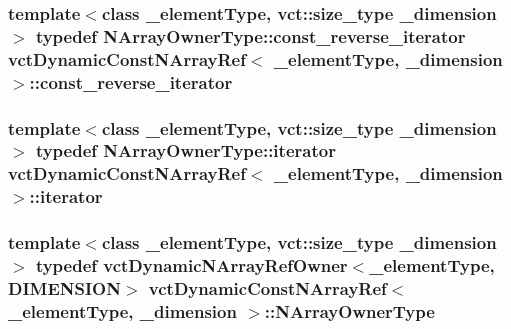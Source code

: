 \subsubsection[{const\+\_\+reverse\+\_\+iterator}]{\setlength{\rightskip}{0pt plus 5cm}template$<$class \+\_\+element\+Type, vct\+::size\+\_\+type \+\_\+dimension$>$ typedef {\bf N\+Array\+Owner\+Type\+::const\+\_\+reverse\+\_\+iterator} {\bf vct\+Dynamic\+Const\+N\+Array\+Ref}$<$ \+\_\+element\+Type, \+\_\+dimension $>$\+::{\bf const\+\_\+reverse\+\_\+iterator}}\label{classvct_dynamic_const_n_array_ref_ac774d4a8e4c0f0a5caeab26c96531d96}
\hypertarget{classvct_dynamic_const_n_array_ref_a29ec06cf468998d878719954c10bc973}{}
\subsubsection[{iterator}]{\setlength{\rightskip}{0pt plus 5cm}template$<$class \+\_\+element\+Type, vct\+::size\+\_\+type \+\_\+dimension$>$ typedef {\bf N\+Array\+Owner\+Type\+::iterator} {\bf vct\+Dynamic\+Const\+N\+Array\+Ref}$<$ \+\_\+element\+Type, \+\_\+dimension $>$\+::{\bf iterator}}\label{classvct_dynamic_const_n_array_ref_a29ec06cf468998d878719954c10bc973}
\hypertarget{classvct_dynamic_const_n_array_ref_a0dc3cb1f3a96c6cf28da6084c4072151}{}
\subsubsection[{N\+Array\+Owner\+Type}]{\setlength{\rightskip}{0pt plus 5cm}template$<$class \+\_\+element\+Type, vct\+::size\+\_\+type \+\_\+dimension$>$ typedef {\bf vct\+Dynamic\+N\+Array\+Ref\+Owner}$<$\+\_\+element\+Type, {\bf D\+I\+M\+E\+N\+S\+I\+O\+N}$>$ {\bf vct\+Dynamic\+Const\+N\+Array\+Ref}$<$ \+\_\+element\+Type, \+\_\+dimension $>$\+::{\bf N\+Array\+Owner\+Type}}\label{classvct_dynamic_const_n_array_ref_a0dc3cb1f3a96c6cf28da6084c4072151}
\hypertarget{classvct_dynamic_const_n_array_ref_a5d4c22b61341f1d69f6bc0f7b176761b}{}
